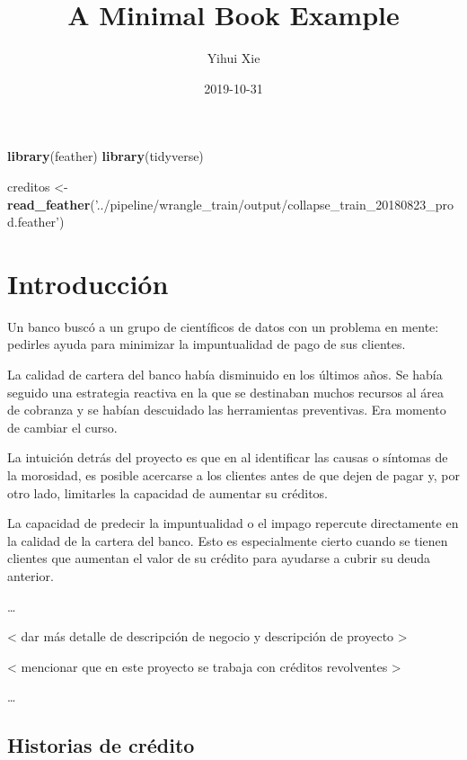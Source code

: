 \documentclass[]{book}
\title{A Minimal Book Example}
\author{Yihui Xie}
\date{2019-10-31}
\newenvironment{Shaded}{\begin{snugshade}}{\end{snugshade}}
\newcommand{\KeywordTok}[1]{\textcolor[rgb]{0.13,0.29,0.53}{\textbf{#1}}}
\newcommand{\NormalTok}[1]{#1}
\newcommand{\StringTok}[1]{\textcolor[rgb]{0.31,0.60,0.02}{#1}}
\begin{document}
\maketitle

{
\setcounter{tocdepth}{1}
\tableofcontents
}
\begin{Shaded}
\begin{Highlighting}[]
\KeywordTok{library}\NormalTok{(feather)}
\KeywordTok{library}\NormalTok{(tidyverse)}

\NormalTok{creditos <-}\StringTok{ }\KeywordTok{read_feather}\NormalTok{(}\StringTok{'../pipeline/wrangle_train/output/collapse_train_20180823_prod.feather'}\NormalTok{)}
\end{Highlighting}
\end{Shaded}

\hypertarget{intro}{%
\chapter{Introducción}\label{intro}}

Un banco buscó a un grupo de científicos de datos con un problema en mente: pedirles ayuda para minimizar la impuntualidad de pago de sus clientes.

La calidad de cartera del banco había disminuido en los últimos años. Se había seguido una estrategia reactiva en la que se destinaban muchos recursos al área de cobranza y se habían descuidado las herramientas preventivas. Era momento de cambiar el curso.

La intuición detrás del proyecto es que en al identificar las causas o síntomas de la morosidad, es posible acercarse a los clientes antes de que dejen de pagar y, por otro lado, limitarles la capacidad de aumentar su créditos.

La capacidad de predecir la impuntualidad o el impago repercute directamente en la calidad de la cartera del banco. Esto es especialmente cierto cuando se tienen clientes que aumentan el valor de su crédito para ayudarse a cubrir su deuda anterior.

\ldots{}

\textless{} dar más detalle de descripción de negocio y descripción de proyecto \textgreater{}

\textless{} mencionar que en este proyecto se trabaja con créditos revolventes \textgreater{}

\ldots{}

\hypertarget{historias-de-cruxe9dito}{%
\section{Historias de crédito}\label{historias-de-cruxe9dito}}
\end{document}
